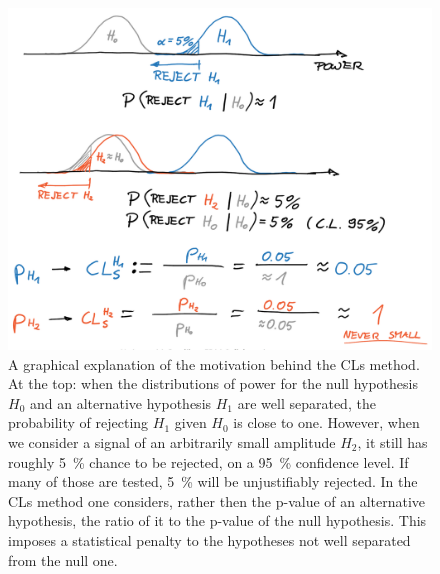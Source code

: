 
\begin{figure}
  \centering \includegraphics[width=0.8\linewidth]{gfx/axions/CLs.png}
  \caption{A graphical explanation of the motivation behind the CLs method. At the top: when the distributions of power for the null hypothesis $H_0$ and an alternative hypothesis $H_1$ are well separated, the probability of rejecting $H_1$ given $H_0$ is close to one. However, when we consider a signal of an arbitrarily small amplitude $H_2$, it still has roughly \SI{5}{\percent} chance to be rejected, on a \SI{95}{\percent} confidence level. If many of those are tested, \SI{5}{\percent} will be unjustifiably rejected. In the CLs method one considers, rather then the p-value of an alternative hypothesis, the ratio of it to the p-value of the null hypothesis. This imposes a statistical penalty to the hypotheses not well separated from the null one.}\label{fig:CLs}
\end{figure}

